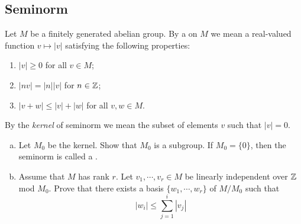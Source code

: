 \subsection{Seminorm}
  \begin{ex}\label{seminorm}
    Let $M$ be a finitely generated abelian group. By a  on $M$ we mean a real-valued function $v\mapsto|v|$ satisfying the following properties:
    \begin{enumerate}
      \item $|v|\geqslant0$ for all $v\in M$;
      \item $|nv|=|n||v|$ for $n\in{\mathbb Z}$;
      \item $|v+w|\leqslant|v|+|w|$ for all $v,w\in M$.
    \end{enumerate}
    By the \emph{kernel} of seminorm we mean the subset of elements $v$ such that $|v|=0$.
    \begin{enumerate}[a)]
      \item Let $M_0$ be the kernel. Show that $M_0$ is a subgroup. If $M_0=\{0\}$, then the seminorm is called a .
      \item Assume that $M$ has rank $r$. Let $v_1,\cdots,v_r\in M$ be linearly independent over ${\mathbb Z}$ mod $M_0$. Prove that there exists a basis $\{w_1,\cdots,w_r\}$ of $M/M_0$ such that
          \begin{equation*}
            |w_i|\leqslant\sum_{j=1}^i|v_j|
          \end{equation*}
    \end{enumerate}
  \end{ex}
